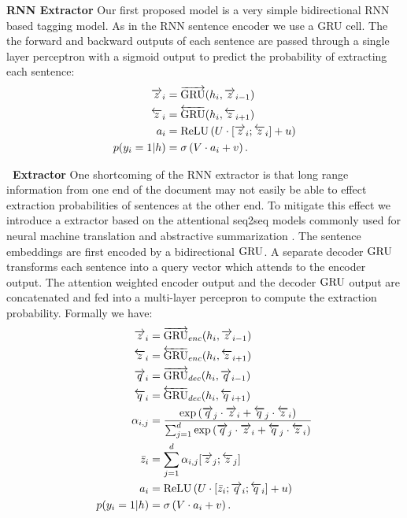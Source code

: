 \textbf{RNN Extractor} Our first proposed model is a very simple bidirectional
RNN based tagging model. As in the RNN sentence encoder we use a GRU cell.
The the forward and backward outputs of each sentence are passed through a 
single layer perceptron with a sigmoid output to predict the probability
of extracting each sentence:
\begin{align}
    \overrightarrow{z}_i &= \overrightarrow{\operatorname{GRU}}(h_i, \overrightarrow{z}_{i-1}) \\
   \overleftarrow{z}_i &= \overleftarrow{\operatorname{GRU}}(h_i, \overleftarrow{z}_{i+1}) \\
   a_i &= \operatorname{ReLU}\left(U \cdot [\overrightarrow{z}_i; \overleftarrow{z}_i] + u \right)\\
   p(y_i=1|h) &= \sigma\left(V\cdot a_i + v  \right).
\end{align}

\textbf{\sts~Extractor} One shortcoming of the RNN extractor is that long range
information from one end of the document may not easily be able to effect 
extraction probabilities of sentences at the other end. To mitigate this effect
we introduce a \sts extractor based on the attentional seq2seq models commonly
used for neural machine translation \cite{badhanau} and 
abstractive summarization \cite{see}. The sentence embeddings are first
encoded by a bidirectional $\operatorname{GRU}$. A separate decoder $\operatorname{GRU}$ transforms each 
sentence into a query vector which attends to the encoder output. The
attention weighted encoder output and the decoder $\operatorname{GRU}$ output are concatenated
and fed into a multi-layer percepron to compute the extraction probability.
Formally we have:
\begin{align}
    \overrightarrow{z}_i &= \overrightarrow{\operatorname{GRU}}_{enc}(h_i, \overrightarrow{z}_{i-1}) \\
    \overleftarrow{z}_i &= \overleftarrow{\operatorname{GRU}}_{enc}(h_i, \overleftarrow{z}_{i+1}) \\
    \overrightarrow{q}_i &= \overrightarrow{\operatorname{GRU}}_{dec}(h_i, \overrightarrow{q}_{i-1}) \\
    \overleftarrow{q}_i &= \overleftarrow{\operatorname{GRU}}_{dec}(h_i, \overleftarrow{q}_{i+1}) \\
    \alpha_{i,j} &= \frac{\exp \left(\overrightarrow{q}_j\cdot \overrightarrow{z}_i + 
\overleftarrow{q}_j \cdot \overleftarrow{z}_i \right)}{
    \sum_{j=1}^{d} \exp \left(\overrightarrow{q}_j\cdot \overrightarrow{z}_i + 
\overleftarrow{q}_j \cdot \overleftarrow{z}_i \right) }\\
\bar{z}_i &= \sum_{j=1}^{d} 
\alpha_{i,j} [\overrightarrow{z}_j ;  \overleftarrow{z}_j] \\
   a_i &= \operatorname{ReLU}\left(U \cdot [\bar{z}_i; \overrightarrow{q}_i; \overleftarrow{q}_i] + u \right)\\
   p(y_i=1|h) &= \sigma\left(V\cdot a_i + v  \right).
\end{align}

